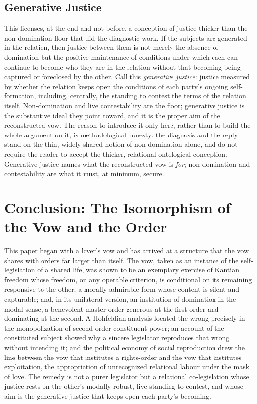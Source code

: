 \documentclass[11pt,a4paper]{article}
\begin{document}
\subsection{Generative Justice}

This licenses, at the end and not before, a conception of justice thicker than the non-domination floor that did the diagnostic work. If the subjects are generated in the relation, then justice between them is not merely the absence of domination but the positive maintenance of conditions under which each can continue to become who they are in the relation without that becoming being captured or foreclosed by the other. Call this \emph{generative justice}: justice measured by whether the relation keeps open the conditions of each party's ongoing self-formation, including, centrally, the standing to contest the terms of the relation itself. Non-domination and live contestability are the floor; generative justice is the substantive ideal they point toward, and it is the proper aim of the reconstructed vow. The reason to introduce it only here, rather than to build the whole argument on it, is methodological honesty: the diagnosis and the reply stand on the thin, widely shared notion of non-domination alone, and do not require the reader to accept the thicker, relational-ontological conception. Generative justice names what the reconstructed vow is \emph{for}; non-domination and contestability are what it must, at minimum, secure.

\section{Conclusion: The Isomorphism of the Vow and the Order}\label{p03:sec:conclusion}

This paper began with a lover's vow and has arrived at a structure that the vow shares with orders far larger than itself. The vow, taken as an instance of the self-legislation of a shared life, was shown to be an exemplary exercise of Kantian freedom whose freedom, on any operable criterion, is conditional on its remaining responsive to the other; a morally admirable form whose content is silent and capturable; and, in its unilateral version, an institution of domination in the modal sense, a benevolent-master order generous at the first order and dominating at the second. A Hohfeldian analysis located the wrong precisely in the monopolization of second-order constituent power; an account of the constituted subject showed why a sincere legislator reproduces that wrong without intending it; and the political economy of social reproduction drew the line between the vow that institutes a rights-order and the vow that institutes exploitation, the appropriation of unrecognized relational labour under the mask of love. The remedy is not a purer legislator but a relational co-legislation whose justice rests on the other's modally robust, live standing to contest, and whose aim is the generative justice that keeps open each party's becoming.
\end{document}
